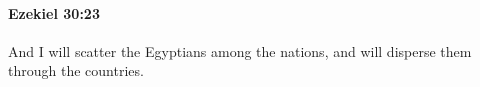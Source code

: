 
		\paragraph{Ezekiel 30:23} %
			\label{EZEKIEL-30-23}

			And I will scatter the Egyptians among the nations, and will disperse them through the countries.


